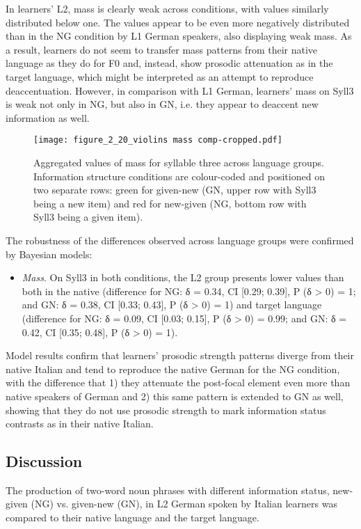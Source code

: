 In learners' L2, mass is clearly weak across conditions, with values similarly distributed below one. The values appear to be even more negatively distributed than in the NG condition by L1 German speakers, also displaying weak mass. As a result, learners do not seem to transfer mass patterns from their native language as they do for F0 and, instead, show prosodic attenuation as in the target language, which might be interpreted as an attempt to reproduce deaccentuation. However, in comparison with L1 German, learners’ mass on Syll3 is weak not only in NG, but also in GN, i.e. they appear to deaccent new information as well.

\begin{figure}
\texttt{[image: figure\_2\_20\_violins mass comp-cropped.pdf]}
\caption{Aggregated values of mass for syllable three across language groups. Information structure conditions are colour-coded and positioned on two separate rows: green for given-new (GN, upper row with Syll3 being a new item) and red for new-given (NG, bottom row with Syll3 being a given item).}
\label{fig:2.20}
\end{figure}

The robustness of the differences observed across language groups were confirmed by Bayesian models:

\begin{itemize}
\item \textit{Mass}. On Syll3 in both conditions, the L2 group presents lower values than both in the native (difference for NG: δ = 0.34, CI [0.29; 0.39], P (δ > 0) = 1; and GN: δ = 0.38, CI [0.33; 0.43], P (δ > 0) = 1) and target language (difference for NG: δ = 0.09, CI [0.03; 0.15], P (δ > 0) = 0.99; and GN: δ = 0.42, CI [0.35; 0.48], P (δ > 0) = 1).
\end{itemize}

Model results confirm that learners’ prosodic strength patterns diverge from their native Italian and tend to reproduce the native German for the NG condition, with the difference that 1) they attenuate the post-focal element even more than native speakers of German and 2) this same pattern is extended to GN as well, showing that they do not use prosodic strength to mark information status contrasts as in their native Italian.

\subsection{Discussion}
\label{sec:2.7.3}
The production of two-word noun phrases with different information status, new-given (NG) vs. given-new (GN), in L2 German spoken by Italian learners was compared to their native language and the target language.

